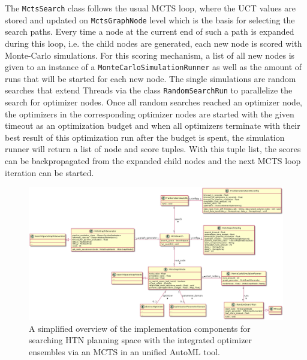 The \texttt{MctsSearch} class follows the usual MCTS loop, where the UCT values are stored and updated on \texttt{MctsGraphNode} level which is the basis for selecting the search paths.
Every time a node at the current end of such a path is expanded during this loop, i.e. the child nodes are generated, each new node is scored with Monte-Carlo simulations.\newline
For this scoring mechanism, a list of all new nodes is given to an instance of a \texttt{MonteCarloSimulationRunner} as well as the amount of runs that will be started for each new node.
The single simulations are random searches that extend Threads via the class \texttt{RandomSearchRun} to parallelize the search for optimizer nodes.
Once all random searches reached an optimizer node, the optimizers in the corresponding optimizer nodes are started with the given timeout as an optimization budget and when all optimizers terminate with their best result of this optimization run after the budget is spent, the simulation runner will return a list of node and score tuples.
With this tuple list, the scores can be backpropagated from the expanded child nodes and the next MCTS loop iteration can be started.

\begin{figure}[ht!]
    \centering
    \includegraphics[angle=90,origin=c,width=\textwidth,height=0.7\textheight,keepaspectratio]{gfx/Figures/Implementation/mcts/MctsAutoML.png}
    \caption{A simplified overview of the implementation components for searching HTN planning space with the integrated optimizer ensembles via an MCTS in an unified AutoML tool.}
    \label{fig:implementation:uml:mcts}
\end{figure}

